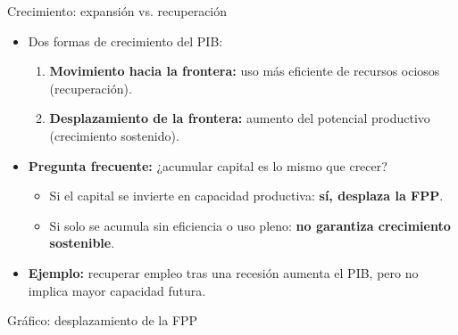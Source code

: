 \documentclass{beamer}
\begin{document}
\begin{frame}{Crecimiento: expansión vs. recuperación}
    \begin{itemize}
        \item Dos formas de crecimiento del PIB:
        \begin{enumerate}
            \item \textbf{Movimiento hacia la frontera:} uso más eficiente de recursos ociosos (recuperación).
            \item \textbf{Desplazamiento de la frontera:} aumento del potencial productivo (crecimiento sostenido).
        \end{enumerate}
        \item \textbf{Pregunta frecuente:} ¿acumular capital es lo mismo que crecer?
        \begin{itemize}
            \item Si el capital se invierte en capacidad productiva: \textbf{sí, desplaza la FPP}.
            \item Si solo se acumula sin eficiencia o uso pleno: \textbf{no garantiza crecimiento sostenible}.
        \end{itemize}
        \item \textbf{Ejemplo:} recuperar empleo tras una recesión aumenta el PIB, pero no implica mayor capacidad futura.
    \end{itemize}
\end{frame}


\begin{frame}{Gráfico: desplazamiento de la FPP}
    \begin{center}
    \end{center}
\end{frame}
\end{document}
